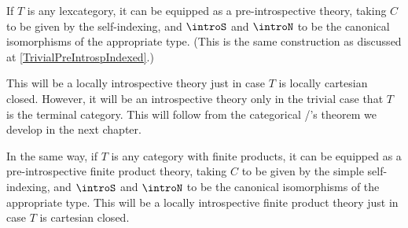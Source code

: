 \begin{construction}\label{TrivialPreIntrosp}
If $T$ is any lexcategory, it can be equipped as a pre-introspective theory, taking $C$ to be given by the self-indexing, and $\introS$ and $\introN$ to be the canonical isomorphisms of the appropriate type. (This is the same construction as discussed at \cref{TrivialPreIntrospIndexed}.)

This will be a locally introspective theory just in case $T$ is locally cartesian closed. However, it will be an introspective theory only in the trivial case that $T$ is the terminal category. This will follow from the categorical \Loeb/'s theorem we develop in the next chapter.

In the same way, if $T$ is any category with finite products, it can be equipped as a pre-introspective finite product theory, taking $C$ to be given by the simple self-indexing, and $\introS$ and $\introN$ to be the canonical isomorphisms of the appropriate type. This will be a locally introspective finite product theory just in case $T$ is cartesian closed.

\end{construction}

